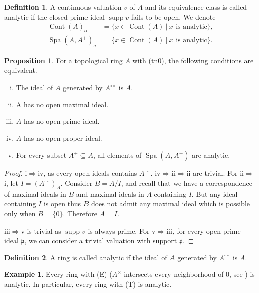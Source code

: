 \documentclass[10pt]{article}
\numberwithin{equation}{section}
\theoremstyle{definition}
\newtheorem{proposition}{Proposition}[subsection]
\newtheorem{definition}{Definition}[subsection]
\newtheorem{example}{Example}[subsection]
\DeclareMathOperator{\supp}{supp}
\DeclareMathOperator{\Spa}{Spa}
\DeclareMathOperator{\Cont}{Cont}
\newcommand{\sep}[0]{\:|\:}
\newcommand{\p}[0]{\mathfrak{p}}
\newcommand{\dcirc}[0]{{\circ\circ}}
\begin{document}
\begin{definition}
    \label{definition_15_7}
    A continuous valuation $v$ of $A$ and its equivalence class is called analytic if the closed prime ideal $\supp v$ fails to be open. We denote
    \begin{align*}
        \Cont(A)_a &= \{x\in\Cont(A)\sep \text{$x$ is analytic}\},\\
        \Spa(A,A^+)_a &= \{x\in\Cont(A)\sep\text{$x$ is analytic}\}.
    \end{align*}
\end{definition}

\begin{proposition}
    \label{fact_15_14} For a topological ring $A$ with (tn0), the following conditions are equivalent.
    \begin{enumerate}[i.]
        \item The ideal of $A$ generated by $A^\dcirc$ is $A$.
        \item A has no open maximal ideal.
        \item $A$ has no open prime ideal.
        \item $A$ has no open proper ideal.
        \item For every subset $A^+\subseteq A$, all elements of $\Spa(A,A^+)$ are analytic.
    \end{enumerate}
\end{proposition}
\begin{proof}
    i$\Rightarrow$iv, as every open ideals contains $A^\dcirc$. iv$\Rightarrow$ii$\Rightarrow$ii are trivial.
    For ii$\Rightarrow$i, let $I= (A^\dcirc)_A$. Consider $B=A/I$, and recall that we have a correspondence of maximal ideals in $B$ and maximal ideals in $A$ containing $I$. But any ideal containing $I$ is open thus $B$ does not admit any maximal ideal which is possible only when $B=\{0\}$. Therefore $A=I$.
    \par iii$\Rightarrow$v is trivial as $\supp v$ is always prime. For v$\Rightarrow $iii, for every open prime ideal $\p$, we can consider a trivial valuation with support $\p$.
\end{proof}
\begin{definition}
    A ring is called analytic if the ideal of $A$ generated by $A^\dcirc$ is $A$.
\end{definition}
\begin{example}
    Every ring with (E) ($A^\times$ intersects every neighborhood of $0$, see ) is analytic. In particular, every ring with (T) is analytic.
\end{example}
\end{document}
